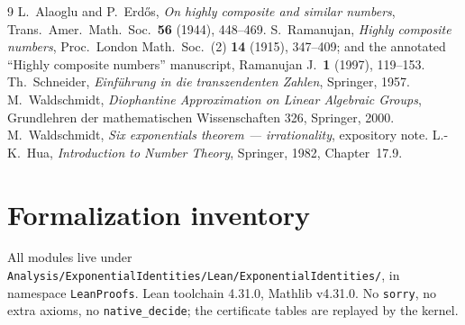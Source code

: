 \documentclass[11pt]{article}
\theoremstyle{definition}
\theoremstyle{remark}
\newcommand{\leanin}[1]{{\footnotesize\texttt{#1}}}
\begin{document}
\begin{thebibliography}{9}
 L.~Alaoglu and P.~Erd\H{o}s, \emph{On highly composite and similar numbers},
Trans.\ Amer.\ Math.\ Soc.\ \textbf{56} (1944), 448--469.
 S.~Ramanujan, \emph{Highly composite numbers}, Proc.\ London Math.\ Soc.\
(2) \textbf{14} (1915), 347--409; and the annotated ``Highly composite numbers'' manuscript,
Ramanujan J.\ \textbf{1} (1997), 119--153.
 Th.~Schneider, \emph{Einf\"uhrung in die transzendenten Zahlen},
Springer, 1957.
 M.~Waldschmidt, \emph{Diophantine Approximation on Linear Algebraic
Groups}, Grundlehren der mathematischen Wissenschaften 326, Springer, 2000.
\bibitem{WaldSix} M.~Waldschmidt, \emph{Six exponentials theorem --- irrationality},
expository note.
 L.-K.~Hua, \emph{Introduction to Number Theory}, Springer, 1982,
Chapter~17.9.
\end{thebibliography}

\appendix
\section{Formalization inventory}\label{app:inventory}

All modules live under
\leanin{Analysis/ExponentialIdentities/Lean/ExponentialIdentities/}, in namespace
\leanin{LeanProofs}. Lean toolchain 4.31.0, Mathlib v4.31.0. No \leanin{sorry}, no extra
axioms, no \leanin{native\_decide}; the certificate tables are replayed by the kernel.
\end{document}
